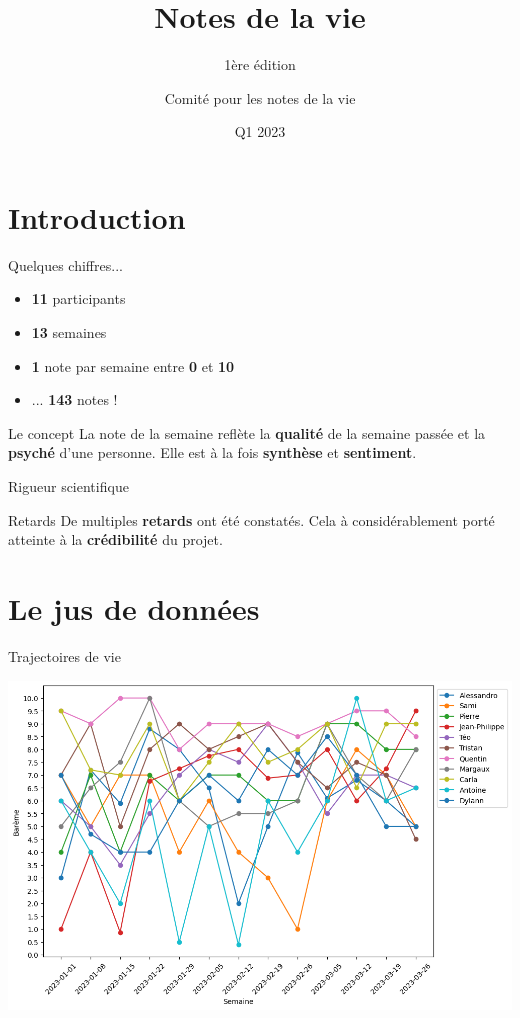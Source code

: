 \documentclass[svgnames]{beamer}
\title{Notes de la vie}
\subtitle{1ère édition}
\author{Comité pour les notes de la vie}
\date{Q1 2023}
\begin{document}
\maketitle

\section{Introduction}

\begin{frame}{Quelques chiffres...}
    \begin{itemize}
        \item <1-> \textbf{11} participants
        \item <2-> \textbf{13} semaines
        \item <3-> \textbf{1} note par semaine entre \textbf{0} et \textbf{10}
        \item <4-> ... \textbf{143} notes !
    \end{itemize}
\end{frame}

\begin{frame}{Le concept}
    \centering
    La note de la semaine reflète la \textbf{qualité} de la semaine passée et la \textbf{psyché} d'une personne. Elle est à la fois \textbf{synthèse} et \textbf{sentiment}.
\end{frame}

\begin{frame}{Rigueur scientifique}

\begin{alertblock}{Retards}
De multiples \textbf{retards} ont été constatés. Cela à considérablement porté atteinte à la \textbf{crédibilité} du projet.
\end{alertblock}
    
\end{frame}

\section{Le jus de données}

\begin{frame}{Trajectoires de vie}

\includegraphics[width=\textwidth]{data/plot.png}
    
\end{frame}
\end{document}
